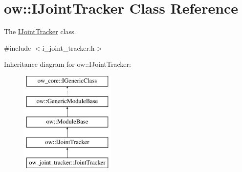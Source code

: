 \hypertarget{classow_1_1IJointTracker}{}\section{ow\+:\+:I\+Joint\+Tracker Class Reference}
\label{classow_1_1IJointTracker}


The \hyperlink{classow_1_1IJointTracker}{I\+Joint\+Tracker} class.  




{\ttfamily \#include $<$i\+\_\+joint\+\_\+tracker.\+h$>$}

Inheritance diagram for ow\+:\+:I\+Joint\+Tracker\+:\begin{figure}[H]
\begin{center}
\leavevmode
\includegraphics[height=5.000000cm]{d6/d14/classow_1_1IJointTracker}
\end{center}
\end{figure}
